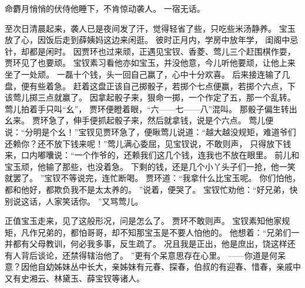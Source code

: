 命麝月悄悄的伏侍他睡下，不肯惊动袭人。
一宿无话。
\par
至次日清晨起来，袭人已是夜间发了汗，觉得轻省了些，只吃些米汤静养。
宝玉放了心，因饭后走到薛姨妈这边来闲逛。
彼时正月内，学房中放年学，
闺阁中忌针，却都是闲时。
因贾环也过来顽，正遇见宝钗、香菱、莺儿三个赶围棋作耍，贾环见了也要顽。
宝钗素习看他亦如宝玉，并没他意，今儿听他要顽，让他上来坐了一处顽。
一磊十个钱，头一回自己赢了，心中十分欢喜。
后来接连输了几盘，便有些着急。
赶着这盘正该自己掷骰子，若掷个七点便赢，若掷个六点，下该莺儿掷三点就赢了。
因拿起骰子来，狠命一掷，一个作定了五，那一个乱转。
莺儿拍着手只叫“幺”， 贾环便瞪着眼，“六——七——八”混叫。
那骰子偏生转出幺来。
贾环急了，伸手便抓起骰子来，然后就拿钱，说是个六点。
莺儿便说：“分明是个幺！”宝钗见贾环急了，便瞅莺儿说道：“越大越没规矩，难道爷们还赖你？还不放下钱来呢！”莺儿满心委屈，见宝钗说，不敢则声，
只得放下钱来，口内嘟囔说：“一个作爷的，还赖我们这几个钱，连我也不放在眼里。
前儿和宝玉顽，他输了那些，也没着急。
下剩的钱，还是几个小丫头子们一抢，他一笑就罢了。
”宝钗不等说完，连忙断喝。
贾环道：“我拿什么比宝玉呢。
你们怕他，都和他好，都欺负我不是太太养的。
”说着，便哭了。
宝钗忙劝他：“好兄弟，快别说这话，人家笑话你。
”又骂莺儿。
\par
正值宝玉走来，见了这般形况，问是怎么了。
贾环不敢则声。
宝钗素知他家规矩，凡作兄弟的，都怕哥哥，却不知那宝玉是不要人怕他的。
他想着：“兄弟们一并都有父母教训，何必我多事，反生疏了。
况且我是正出，他是庶出，饶这样还有人背后谈论，还禁得辖治他了。
”更有个呆意思存在心里。
——你道是何呆意？因他自幼姊妹丛中长大，亲姊妹有元春、探春，伯叔的有迎春、惜春，亲戚中又有史湘云、林黛玉、薛宝钗等诸人。
